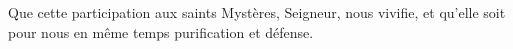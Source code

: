 Que cette participation aux saints Mystères, Seigneur, nous vivifie, et qu’elle soit pour nous en même temps purification et défense.
